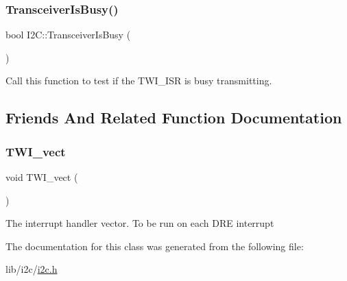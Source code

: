 \subsubsection{\texorpdfstring{Transceiver\+Is\+Busy()}{TransceiverIsBusy()}}
{\footnotesize\ttfamily bool I2\+C\+::\+Transceiver\+Is\+Busy (\begin{DoxyParamCaption}{ }\end{DoxyParamCaption})}

Call this function to test if the T\+W\+I\+\_\+\+I\+SR is busy transmitting. 

\subsection{Friends And Related Function Documentation}
\hypertarget{class_i2_c_a9d6ec6457f300cca833eb7193feabfbc}{}\label{class_i2_c_a9d6ec6457f300cca833eb7193feabfbc} 
\subsubsection{\texorpdfstring{T\+W\+I\+\_\+vect}{TWI\_vect}}
{\footnotesize\ttfamily void T\+W\+I\+\_\+vect (\begin{DoxyParamCaption}{ }\end{DoxyParamCaption})\hspace{0.3cm}{\ttfamily [friend]}}

The interrupt handler vector. To be run on each D\+RE interrupt 

The documentation for this class was generated from the following file\+:\begin{DoxyCompactItemize}
\item 
lib/i2c/\hyperlink{i2c_8h}{i2c.\+h}\end{DoxyCompactItemize}
